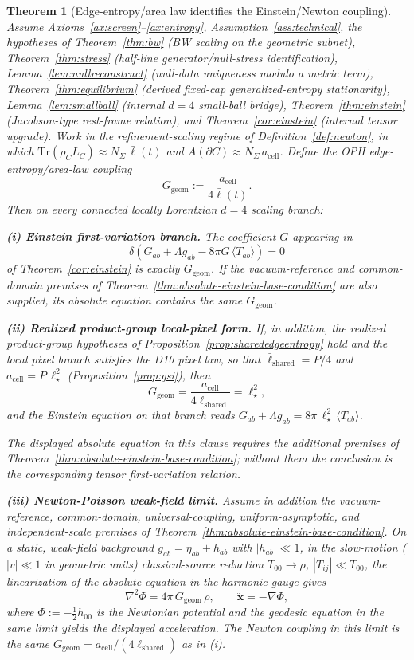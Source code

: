 \documentclass[11pt]{article}
\newtheorem{theorem}{Theorem}[section]
\begin{document}
\begin{theorem}[Edge-entropy/area law identifies the Einstein/Newton coupling]\label{thm:edge-entropy-newton-coupling}
Assume Axioms~\ref{ax:screen}--\ref{ax:entropy}, Assumption~\ref{ass:technical}, the hypotheses of Theorem~\ref{thm:bw} (BW scaling on the geometric subnet), Theorem~\ref{thm:stress} (half-line generator/null-stress identification), Lemma~\ref{lem:nullreconstruct} (null-data uniqueness modulo a metric term), Theorem~\ref{thm:equilibrium} (derived fixed-cap generalized-entropy stationarity), Lemma~\ref{lem:smallball} (internal \(d=4\) small-ball bridge), Theorem~\ref{thm:einstein} (Jacobson-type rest-frame relation), and Theorem~\ref{cor:einstein} (internal tensor upgrade). Work in the refinement-scaling regime of Definition~\ref{def:newton}, in which \(\mathrm{Tr}(\rho_C L_C)\approx N_\Sigma\,\bar\ell(t)\) and \(A(\partial C)\approx N_\Sigma\,a_{\mathrm{cell}}\). Define the OPH edge-entropy/area-law coupling
\[
G_{\mathrm{geom}}:=\frac{a_{\mathrm{cell}}}{4\bar\ell(t)}.
\]
Then on every connected locally Lorentzian \(d=4\) scaling branch:

\textbf{(i) Einstein first-variation branch.} The coefficient \(G\) appearing in
\[
\delta\!\left(G_{ab}+\Lambda g_{ab}
-8\pi G\,\langle T_{ab}\rangle\right)=0
\]
of Theorem~\ref{cor:einstein} is exactly \(G_{\mathrm{geom}}\). If the
vacuum-reference and common-domain premises of
Theorem~\ref{thm:absolute-einstein-base-condition} are also supplied, its
absolute equation contains the same \(G_{\mathrm{geom}}\).

\textbf{(ii) Realized product-group local-pixel form.} If, in addition, the realized product-group hypotheses of Proposition~\ref{prop:sharededgeentropy} hold and the local pixel branch satisfies the D10 pixel law, so that \(\bar\ell_{\mathrm{shared}}=P/4\) and \(a_{\mathrm{cell}}=P\,\ell_\star^2\) (Proposition~\ref{prop:gsi}), then
\[
G_{\mathrm{geom}}=\frac{a_{\mathrm{cell}}}{4\bar\ell_{\mathrm{shared}}}=\ell_\star^2,
\]
and the Einstein equation on that branch reads \(G_{ab}+\Lambda g_{ab}=8\pi\,\ell_\star^2\,\langle T_{ab}\rangle\).

The displayed absolute equation in this clause requires the additional
premises of Theorem~\ref{thm:absolute-einstein-base-condition}; without them
the conclusion is the corresponding tensor first-variation relation.

\textbf{(iii) Newton-Poisson weak-field limit.} Assume in addition the
vacuum-reference, common-domain, universal-coupling, uniform-asymptotic, and
independent-scale premises of
Theorem~\ref{thm:absolute-einstein-base-condition}. On a static, weak-field
background \(g_{ab}=\eta_{ab}+h_{ab}\) with \(|h_{ab}|\ll 1\), in the
slow-motion (\(|v|\ll 1\) in geometric units) classical-source reduction
\(T_{00}\to\rho\), \(|T_{ij}|\ll T_{00}\), the linearization of the
absolute equation in the harmonic gauge gives
\[
\nabla^2\Phi=4\pi\,G_{\mathrm{geom}}\,\rho,
\qquad
\ddot{\mathbf x}=-\nabla\Phi,
\]
where \(\Phi:=-\tfrac12 h_{00}\) is the Newtonian potential and the geodesic equation in the same limit yields the displayed acceleration. The Newton coupling in this limit is the same \(G_{\mathrm{geom}}=a_{\mathrm{cell}}/(4\bar\ell_{\mathrm{shared}})\) as in (i).


\end{theorem}
\end{document}
